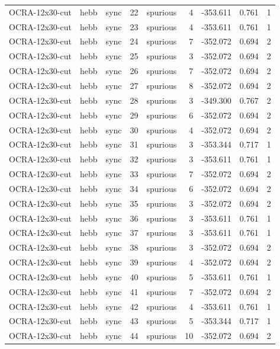 \begin{tabular}{lllrlrrrr}
OCRA-12x30-cut & hebb & sync & 22 & spurious & 4 & -353.611 & 0.761 & 1 \\
OCRA-12x30-cut & hebb & sync & 23 & spurious & 4 & -353.611 & 0.761 & 1 \\
OCRA-12x30-cut & hebb & sync & 24 & spurious & 7 & -352.072 & 0.694 & 2 \\
OCRA-12x30-cut & hebb & sync & 25 & spurious & 3 & -352.072 & 0.694 & 2 \\
OCRA-12x30-cut & hebb & sync & 26 & spurious & 7 & -352.072 & 0.694 & 2 \\
OCRA-12x30-cut & hebb & sync & 27 & spurious & 8 & -352.072 & 0.694 & 2 \\
OCRA-12x30-cut & hebb & sync & 28 & spurious & 3 & -349.300 & 0.767 & 2 \\
OCRA-12x30-cut & hebb & sync & 29 & spurious & 6 & -352.072 & 0.694 & 2 \\
OCRA-12x30-cut & hebb & sync & 30 & spurious & 4 & -352.072 & 0.694 & 2 \\
OCRA-12x30-cut & hebb & sync & 31 & spurious & 3 & -353.344 & 0.717 & 1 \\
OCRA-12x30-cut & hebb & sync & 32 & spurious & 3 & -353.611 & 0.761 & 1 \\
OCRA-12x30-cut & hebb & sync & 33 & spurious & 7 & -352.072 & 0.694 & 2 \\
OCRA-12x30-cut & hebb & sync & 34 & spurious & 6 & -352.072 & 0.694 & 2 \\
OCRA-12x30-cut & hebb & sync & 35 & spurious & 3 & -352.072 & 0.694 & 2 \\
OCRA-12x30-cut & hebb & sync & 36 & spurious & 3 & -353.611 & 0.761 & 1 \\
OCRA-12x30-cut & hebb & sync & 37 & spurious & 3 & -353.611 & 0.761 & 1 \\
OCRA-12x30-cut & hebb & sync & 38 & spurious & 3 & -352.072 & 0.694 & 2 \\
OCRA-12x30-cut & hebb & sync & 39 & spurious & 4 & -352.072 & 0.694 & 2 \\
OCRA-12x30-cut & hebb & sync & 40 & spurious & 5 & -353.611 & 0.761 & 1 \\
OCRA-12x30-cut & hebb & sync & 41 & spurious & 7 & -352.072 & 0.694 & 2 \\
OCRA-12x30-cut & hebb & sync & 42 & spurious & 4 & -353.611 & 0.761 & 1 \\
OCRA-12x30-cut & hebb & sync & 43 & spurious & 5 & -353.344 & 0.717 & 1 \\
OCRA-12x30-cut & hebb & sync & 44 & spurious & 10 & -352.072 & 0.694 & 2 \\

\end{tabular}
